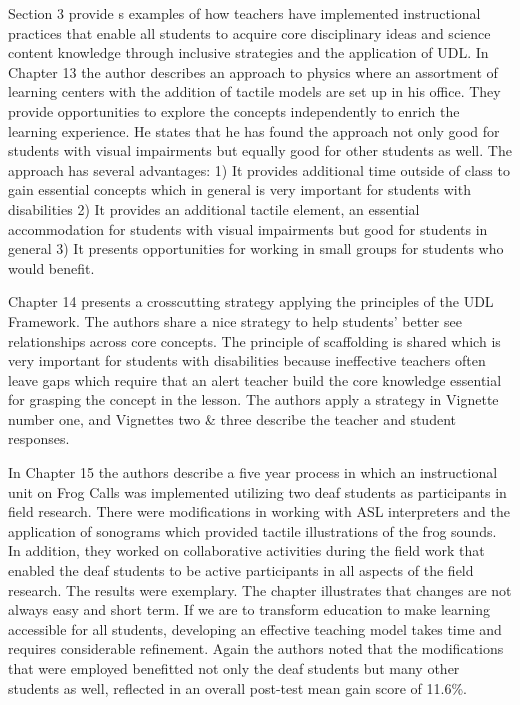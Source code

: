 \documentclass[11.5pt]{sig-alternate} %
\begin{document}
\begin{large}
Section 3 provide s examples of how teachers  have implemented instructional practices that enable all students to acquire core disciplinary ideas and science content knowledge through inclusive strategies and the application of UDL.  In Chapter 13 the author describes an approach to physics where an assortment of learning centers with the addition of tactile models are set up in his office. They provide opportunities to explore the concepts independently to enrich the learning experience.  He states that he has found the approach not only good for students with visual impairments but equally good for other students as well.  The approach has several advantages: 1) It provides additional time outside of class to gain essential concepts which in general is very important for students with disabilities 2) It provides an additional tactile element, an essential accommodation for students with visual impairments but good for students in general 3) It presents opportunities for working in small groups for students who would benefit. 

Chapter 14 presents a crosscutting strategy applying the principles of the UDL Framework.  The authors share a nice strategy to help students’ better see relationships across core concepts.  The principle of scaffolding is shared which is very important for students with disabilities because ineffective teachers often leave gaps which require that an alert teacher build the core knowledge essential for grasping the concept in the lesson.   The authors apply a strategy in Vignette number one, and Vignettes two \& three describe the teacher and student responses.  

In Chapter 15 the authors describe a five year process in which an instructional unit on Frog Calls was implemented utilizing two deaf students as participants in field research.  There were modifications in working with ASL interpreters and the application of sonograms which provided tactile illustrations of the frog sounds.  In addition, they worked on collaborative activities during the field work that enabled the deaf students to be active participants in all aspects of the field research.  The results were exemplary.  The chapter illustrates that changes are not always easy and short term.  If we are to transform education to make learning accessible for all students, developing an effective teaching model takes time and requires considerable refinement. Again the authors noted that the modifications that were employed benefitted not only the deaf students but many other students as well, reflected in an overall post-test mean gain score of 11.6\%.


\end{large}
\end{document}

